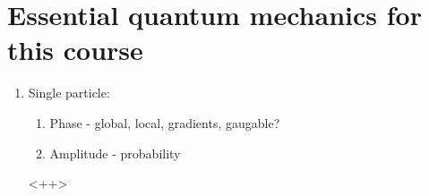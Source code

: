 \section{Essential quantum mechanics for this course}

\begin{enumerate}
	\item Single particle:
		\begin{enumerate}
			\item Phase - global, local, gradients, gaugable?
			\item Amplitude - probability
		\end{enumerate}<++>
\end{enumerate}
